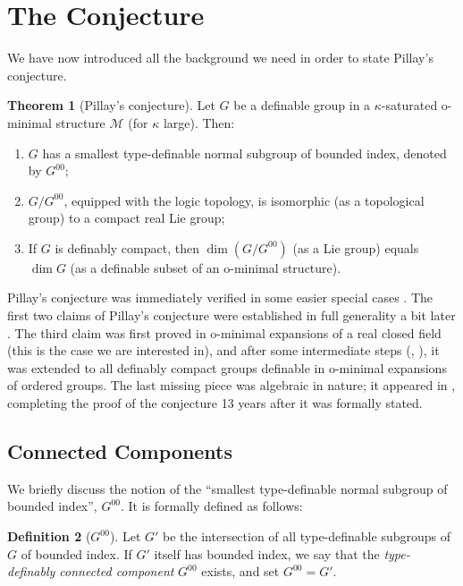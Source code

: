 \documentclass[a4paper]{report}
\newcommand{\ind}{\hspace{15pt}}
\newcommand{\M}{\mathcal{M}}
\theoremstyle{definition}
\newtheorem{thm}{Theorem}[chapter]
\newtheorem{defn}[thm]{Definition}
\theoremstyle{remstyle}
\begin{document}
\section{The Conjecture}

\ind We have now introduced all the background we need in order to state Pillay's conjecture.

\begin{thm}[Pillay's conjecture]\label{pil conj}
	Let $G$ be a definable group in a $\kappa$-saturated o-minimal structure $\M$ (for $\kappa$ large). Then:
	\begin{enumerate}
		\item $G$ has a smallest type-definable normal subgroup of bounded index, denoted by $G^{00}$;
		\item $G/G^{00}$, equipped with the logic topology, is isomorphic (as a topological group) to a compact real Lie group;
		\item If $G$ is definably compact, then $\dim(G/G^{00})$ (as a Lie group) equals $\dim G$ (as a definable subset of an o-minimal structure).
	\end{enumerate}
\end{thm}

\ind Pillay's conjecture was immediately verified in some easier special cases \cite{typedef}. The first two claims of Pillay's conjecture were established in full generality a bit later \cite{desc chain con}. The third claim was first proved in o-minimal expansions of a real closed field \cite{groups measures nip} (this is the case we are interested in), and after some intermediate steps (\cite{ordered vs}, \cite{semi-bounded}), it was extended to all definably compact groups definable in o-minimal expansions of ordered groups. The last missing piece was algebraic in nature; it appeared in \cite{Pillay general}, completing the proof of the conjecture 13 years after it was formally stated.


\subsection{Connected Components}

\ind We briefly discuss the notion of the ``smallest type-definable normal subgroup of bounded index'', $G^{00}$. It is formally defined as follows:

\begin{defn}[$G^{00}$]
	Let $G'$ be the intersection of all type-definable subgroups of $G$ of bounded index. If $G'$ itself has bounded index, we say that the \emph{type-definably connected component} $G^{00}$ exists, and set $G^{00}=G'$.
\end{defn}
\end{document}
